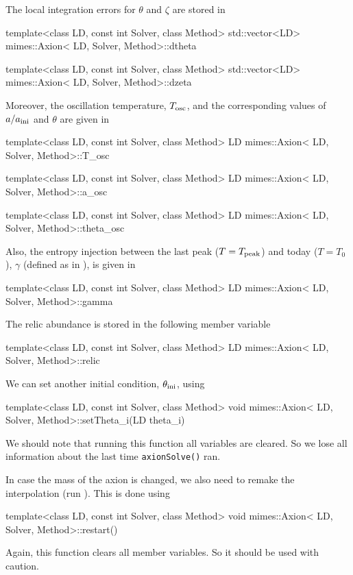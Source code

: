 \documentclass[11pt,a4paper]{article}
\begin{document}
The local integration errors for $\theta$ and $\zeta$ are stored in
%
\begin{cpp}
	template<class LD, const int Solver, class Method> 
	std::vector<LD> mimes::Axion< LD, Solver, Method>::dtheta
	
	template<class LD, const int Solver, class Method> 
	std::vector<LD> mimes::Axion< LD, Solver, Method>::dzeta
\end{cpp}
%
Moreover, the oscillation temperature, $T_{\rm osc}{}$, and the corresponding values of $a/a_{\rm ini}{}$ and $\theta$ are given in
%
\begin{cpp}
	template<class LD, const int Solver, class Method>
	LD mimes::Axion< LD, Solver, Method>::T_osc
	
	template<class LD, const int Solver, class Method>
	LD mimes::Axion< LD, Solver, Method>::a_osc

	template<class LD, const int Solver, class Method>
	LD mimes::Axion< LD, Solver, Method>::theta_osc
\end{cpp}
%
Also, the entropy injection between the last peak ($T=T_{\rm peak}$) and today ($T=T_0$), $\gamma$ (defined as in ), is given in 
%
\begin{cpp}
	template<class LD, const int Solver, class Method>
	LD mimes::Axion< LD, Solver, Method>::gamma
\end{cpp}
%
The relic abundance is stored in the following member variable 
%
\begin{cpp}
	template<class LD, const int Solver, class Method>
	LD mimes::Axion< LD, Solver, Method>::relic
\end{cpp}



We can set another initial condition, $\theta_{\rm ini}{}$, using 
%
\begin{cpp}
	template<class LD, const int Solver, class Method>
	void mimes::Axion< LD, Solver, Method>::setTheta_i(LD theta_i)
\end{cpp}
%
We should note that running this function all variables are cleared. So we lose all information about the last time {\tt axionSolve()} ran. 

In case the mass of the axion is changed, we also need to remake  the interpolation (\ie run ). This is done using
%
\begin{cpp}
	template<class LD, const int Solver, class Method>
	void mimes::Axion< LD, Solver, Method>::restart()
\end{cpp}
%
Again, this function clears all member variables. So it should be used with caution.
\end{document}
